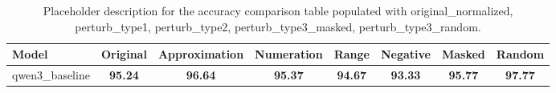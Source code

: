 \begin{table}[ht]
\centering
{}
\small
\begin{tabular}{lccccccc}
\hline
Model & Original & Approximation & Numeration & Range & Negative & Masked & Random \\
\hline
qwen3\_baseline & \textbf{95.24} & \textbf{96.64} & \textbf{95.37} & \textbf{94.67} & \textbf{93.33} & \textbf{95.77} & \textbf{97.77} \\
\hline
\end{tabular}
\caption{Placeholder description for the accuracy comparison table populated with original\_normalized, perturb\_type1, perturb\_type2, perturb\_type3\_masked, perturb\_type3\_random.}
\end{table}
